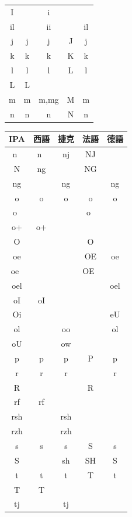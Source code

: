 \begin{table}
\begin{tabular}{|c|cccc|}
  I   &     &  i  &      &     \\
  il  &     & ii  &      &   il \\
  j   &  j  &  j  & J    &    j \\
  k   &  k  &  k  & K    &    k \\
  l   &  l  &  l  & L    &    l \\
  L   &  L  &     &      &      \\
  m   &  m  & m,mg & M   &    m \\
  n   &  n  &  n   & N   &    n \\
\hline
\end{tabular}
\begin{tabular}{|c|cccc|}
\hline
 IPA & 西語 & 捷克 & 法語 & 德語 \\
\hline
  n~  &  n~ &  nj  & NJ  &      \\
  N   &  ng &      & NG  &      \\
  ng  &     &  ng  &     &   ng \\
  o   &  o  &   o & o    &   o  \\
  o~  &     &     & o~   &      \\
  o+  &  o+ &     &      &      \\
  O   &     &     & O    &      \\
  oe  &     &     & OE   &   oe \\
  oe~ &     &     & OE~  &      \\
  oel &     &     &      &  oel \\
  oI  &  oI &     &      &      \\
  Oi  &     &     &     &  eU \\
  ol  &     & oo  &     &  ol \\
  oU  &     & ow  &     &     \\
  p   &  p  &  p  & P   &   p \\
  r   &  r  &  r  &     &   r \\
  R   &     &     & R   &     \\
  rf  & rf  &     &     &     \\
  rsh &     & rsh &     &     \\
  rzh &     & rzh &     &     \\
  s   &  s  &  s  & S   &   s \\
  S   &     & sh  & SH  &   S \\
  t   &  t  &  t  & T   &   t \\
  T   &  T  &     &     &     \\
  tj  &     & tj  &     &     \\

\end{tabular}
\end{table}
